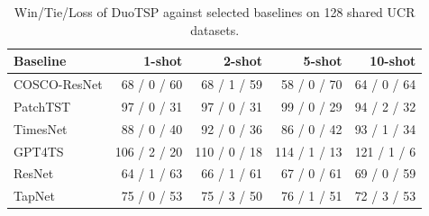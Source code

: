 \begin{table}[t]
\centering
\caption{Win/Tie/Loss of DuoTSP against selected baselines on 128 shared UCR datasets.}
\label{tab:ucr_fewshot_paper_current-paper-wtl}
\begin{tabular}{lrrrr}
\toprule
Baseline & 1-shot & 2-shot & 5-shot & 10-shot \\
\midrule
COSCO-ResNet & 68 / 0 / 60 & 68 / 1 / 59 & 58 / 0 / 70 & 64 / 0 / 64 \\
PatchTST & 97 / 0 / 31 & 97 / 0 / 31 & 99 / 0 / 29 & 94 / 2 / 32 \\
TimesNet & 88 / 0 / 40 & 92 / 0 / 36 & 86 / 0 / 42 & 93 / 1 / 34 \\
GPT4TS & 106 / 2 / 20 & 110 / 0 / 18 & 114 / 1 / 13 & 121 / 1 / 6 \\
ResNet & 64 / 1 / 63 & 66 / 1 / 61 & 67 / 0 / 61 & 69 / 0 / 59 \\
TapNet & 75 / 0 / 53 & 75 / 3 / 50 & 76 / 1 / 51 & 72 / 3 / 53 \\
\bottomrule
\end{tabular}
\end{table}
